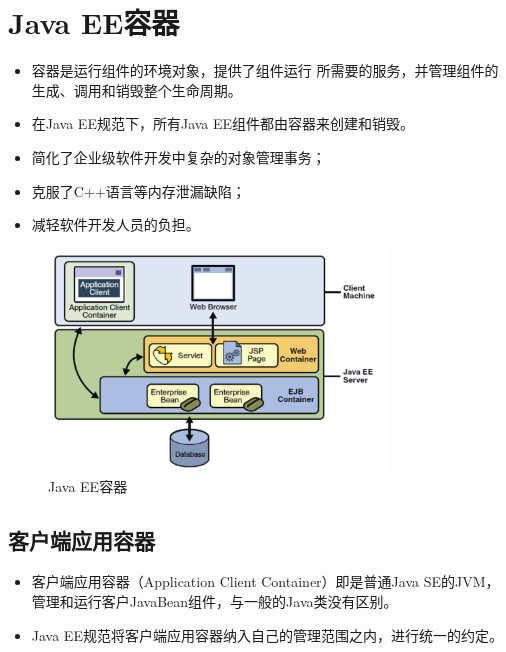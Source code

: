 \section{Java EE容器}

  
\begin{itemize}
\item {\hei\Blue 容器}是运行{\hei\Red 组件}的环境对象，提供了组件运行
  所需要的服务，并管理组件的生成、调用和销毁整个生命周期。
\item 在Java EE规范下，所有Java EE组件都由容器来创建和销毁。
\end{itemize}

  
\begin{itemize}
\item 简化了企业级软件开发中复杂的对象管理事务；
\item 克服了C++语言等内存泄漏缺陷；
\item 减轻软件开发人员的负担。
\end{itemize}

\begin{figure}[htb]
\centering
\includegraphics[width=0.8\textwidth]{images/JavaEE-architecture/fig-javaee-containers.png}
\caption{Java EE容器}
\label{fig:javaee-containers}
\end{figure}

\subsection{客户端应用容器} 

\begin{itemize}
\item 客户端应用容器（Application Client Container）即是普通Java
  SE的JVM，管理和运行客户JavaBean组件，与一般的Java类没有区别。
\item Java EE规范将客户端应用容器纳入自己的管理范围之内，进行统一的约定。
\end{itemize}


